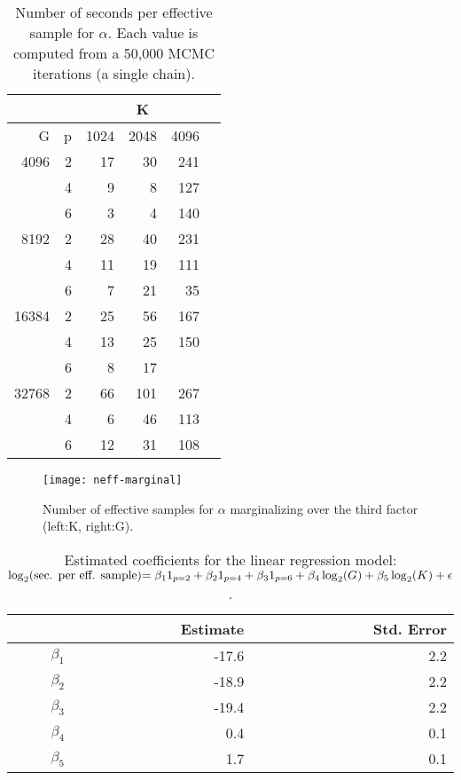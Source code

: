 \begin{table}[ht]
\centering
\begin{tabular}{rrrrrr}

  &   & \multicolumn{3}{c}{K}\\
  \hline
G & p & 1024 & 2048 & 4096 \\ 
  \hline
4096  & 2 & 17 & 30 & 241 \\ 
      & 4 & 9 & 8 & 127 \\ 
      & 6 & 3 & 4 & 140 \\ 
8192  & 2 & 28 & 40 & 231 \\ 
      & 4 & 11 & 19 & 111 \\ 
      & 6 & 7 & 21 & 35 \\ 
16384 & 2 & 25 & 56 & 167 \\ 
      & 4 & 13 & 25 & 150 \\ 
      & 6 & 8 & 17 &  \\ 
32768 & 2 & 66 & 101 & 267 \\ 
      & 4 & 6 & 46 & 113 \\ 
      & 6 & 12 & 31 & 108 \\ 
   \hline
\end{tabular}
\caption{Number of seconds per effective sample for $\alpha$. Each value is computed from a 50,000 MCMC iterations (a single chain).}
\label{table:neff-alpha}
\end{table}

\begin{figure}
\centering
\texttt{[image: neff-marginal]}
\caption{Number of effective samples for $\alpha$ marginalizing over the third factor (left:K, right:G).}
\label{fig:neff-marginal}
\end{figure}

\begin{table}[ht]
\centering
\begin{tabular}{rrr}
  \hline
    & Estimate & Std. Error\\ 
  \hline
  $\beta_1$ & -17.6 & 2.2\\ 
  $\beta_2$ & -18.9 & 2.2\\ 
  $\beta_3$ & -19.4 & 2.2\\ 
  $\beta_4$ & 0.4 & 0.1\\ 
  $\beta_5$ & 1.7 & 0.1\\
   \hline
\end{tabular}
\caption[Estimated coefficients for the linear regression model: (model)]{Estimated coefficients for the linear regression model: \\\hspace{\textwidth}\(\log_2$(sec. per eff. sample)$=\beta_1 1_{p=2}+\beta_2 1_{p=4} + \beta_3 1_{p=6} + \beta_4 \log_2(G) + \beta_5 \log_2(K) + \epsilon\).}
\label{regression}
\end{table}


